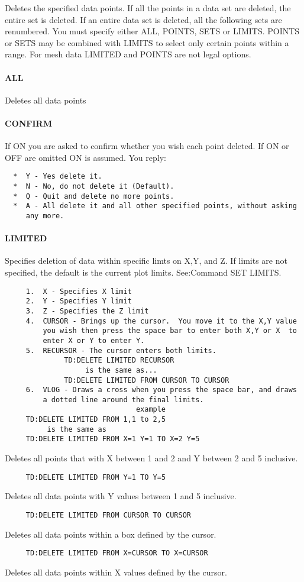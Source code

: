 Deletes the specified data points.  If all the points in a data set are
deleted, the entire set is deleted.  If an entire data set is  deleted,
all  the  following  sets are renumbered.  You must specify either ALL,
POINTS, SETS or LIMITS.  POINTS or SETS may be combined with LIMITS  to
select  only  certain points within a range.  For mesh data LIMITED and
POINTS are not legal options.  
\paragraph{ALL}
Deletes all data points 
\paragraph{CONFIRM}
If  ON  you are asked to confirm whether you wish each point deleted.
If ON or OFF are omitted ON is assumed.  You reply:  
\begin{verbatim}
  *  Y - Yes delete it.  
  *  N - No, do not delete it (Default).  
  *  Q - Quit and delete no more points.  
  *  A - All delete it and all other specified points, without asking
     any more.  
\end{verbatim}
\paragraph{LIMITED}
Specifies  deletion  of data within specific limts on X,Y, and Z.  If
limits are not specified, the default is  the  current  plot  limits.
See:Command SET LIMITS.  
\begin{verbatim}
     1.  X - Specifies X limit 
     2.  Y - Specifies Y limit 
     3.  Z - Specifies the Z limit 
     4.  CURSOR - Brings up the cursor.  You move it to the X,Y value
         you wish then press the space bar to enter both X,Y or X  to
         enter X or Y to enter Y.  
     5.  RECURSOR - The cursor enters both limits.  
              TD:DELETE LIMITED RECURSOR 
                   is the same as...  
              TD:DELETE LIMITED FROM CURSOR TO CURSOR 
     6.  VLOG - Draws a cross when you press the space bar, and draws
         a dotted line around the final limits.  
                               example
     TD:DELETE LIMITED FROM 1,1 to 2,5 
          is the same as 
     TD:DELETE LIMITED FROM X=1 Y=1 TO X=2 Y=5 
\end{verbatim}
Deletes  all points that with X between 1 and 2 and Y between 2 and 5
inclusive.  
\begin{verbatim}
     TD:DELETE LIMITED FROM Y=1 TO Y=5 
\end{verbatim}
Deletes all data points with Y values between 1 and 5 inclusive.  
\begin{verbatim}
     TD:DELETE LIMITED FROM CURSOR TO CURSOR 
\end{verbatim}
Deletes all data points within a box defined by the cursor.  
\begin{verbatim}
     TD:DELETE LIMITED FROM X=CURSOR TO X=CURSOR 
\end{verbatim}
Deletes all data points within X values defined by the cursor.  
